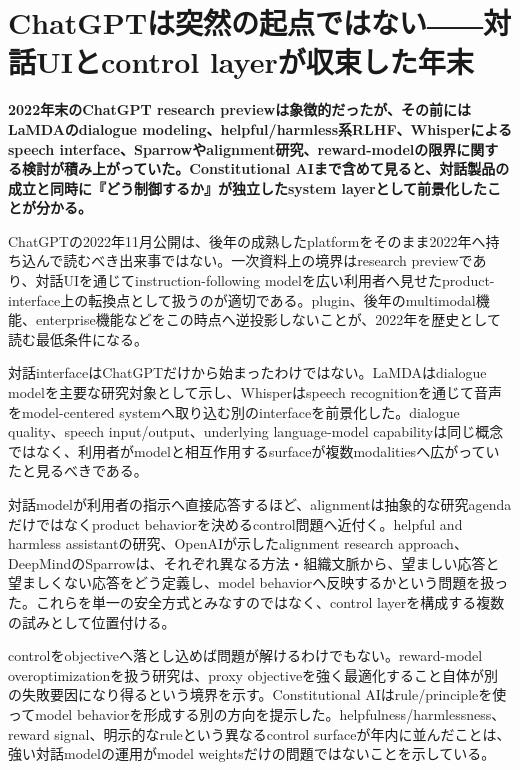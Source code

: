 \section{ChatGPTは突然の起点ではない――対話UIとcontrol layerが収束した年末}
\noindent\textbf{2022年末のChatGPT research previewは象徴的だったが、その前にはLaMDAのdialogue modeling、helpful/harmless系RLHF、Whisperによるspeech interface、Sparrowやalignment研究、reward-modelの限界に関する検討が積み上がっていた。Constitutional AIまで含めて見ると、対話製品の成立と同時に『どう制御するか』が独立したsystem layerとして前景化したことが分かる。}\autocite{src-2a9e3cfb3148,src-2b132b9f05ef,src-7ef567047bd7,src-bc1a61aec959,src-f4ecc26bd1e5}

ChatGPTの2022年11月公開は、後年の成熟したplatformをそのまま2022年へ持ち込んで読むべき出来事ではない。一次資料上の境界はresearch previewであり、対話UIを通じてinstruction-following modelを広い利用者へ見せたproduct-interface上の転換点として扱うのが適切である。plugin、後年のmultimodal機能、enterprise機能などをこの時点へ逆投影しないことが、2022年を歴史として読む最低条件になる。\autocite{src-bc1a61aec959}


対話interfaceはChatGPTだけから始まったわけではない。LaMDAはdialogue modelを主要な研究対象として示し、Whisperはspeech recognitionを通じて音声をmodel-centered systemへ取り込む別のinterfaceを前景化した。dialogue quality、speech input/output、underlying language-model capabilityは同じ概念ではなく、利用者がmodelと相互作用するsurfaceが複数modalitiesへ広がっていたと見るべきである。\autocite{src-2a9e3cfb3148,src-2b132b9f05ef,src-7ef567047bd7}


対話modelが利用者の指示へ直接応答するほど、alignmentは抽象的な研究agendaだけではなくproduct behaviorを決めるcontrol問題へ近付く。helpful and harmless assistantの研究、OpenAIが示したalignment research approach、DeepMindのSparrowは、それぞれ異なる方法・組織文脈から、望ましい応答と望ましくない応答をどう定義し、model behaviorへ反映するかという問題を扱った。これらを単一の安全方式とみなすのではなく、control layerを構成する複数の試みとして位置付ける。\autocite{src-81cf88ab9c36,src-ce2ca3d4fe8f,src-d7f602cae828}


controlをobjectiveへ落とし込めば問題が解けるわけでもない。reward-model overoptimizationを扱う研究は、proxy objectiveを強く最適化すること自体が別の失敗要因になり得るという境界を示す。Constitutional AIはrule/principleを使ってmodel behaviorを形成する別の方向を提示した。helpfulness/harmlessness、reward signal、明示的なruleという異なるcontrol surfaceが年内に並んだことは、強い対話modelの運用がmodel weightsだけの問題ではないことを示している。\autocite{src-1a032a768300,src-83ce66a102c3,src-ce2ca3d4fe8f,src-f4ecc26bd1e5}


